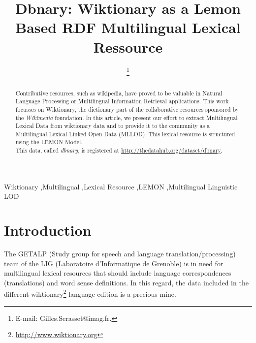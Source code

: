 \documentclass[sw]{iosart2c}
\begin{document}
\begin{frontmatter}

\title{Dbnary: Wiktionary as a Lemon Based RDF Multilingual Lexical Ressource}



\author{ \thanks{E-mail: Gilles.Serasset@imag.fr.}}
\address{GETALP-LIG, UJF-Grenoble 1 \\BP 53, 38051 Grenoble cedex 9, France\\ \texttt{gilles.serasset@imag.fr}}


\begin{abstract}
Contributive resources, such as wikipedia, have proved to be valuable in Natural Language Processing or Multilingual Information Retrieval applications. This work focusses on Wiktionary, the dictionary part of the collaborative resources sponsored by the \emph{Wikimedia} foundation. In this article, we present our effort to extract Multilingual Lexical Data from wiktionary data and to provide it to the community as a Multilingual Lexical Linked Open Data (MLLOD). This lexical resource is structured using the LEMON Model.\\
This data, called \textit{dbnary}, is registered at \url{http://thedatahub.org/dataset/dbnary}.
\end{abstract}

\begin{keyword}
Wiktionary \sep Multilingual \sep Lexical Resource \sep LEMON \sep Multilingual Linguistic LOD
\end{keyword}

\end{frontmatter}

\section{Introduction}

The GETALP (Study group for speech and language translation/processing) team of the LIG (Laboratoire d'Informatique de Grenoble) is in need for multilingual lexical resources that should include language correspondences (translations) and word sense definitions. In this regard, the data included in the different wiktionary\footnote{\url{http://www.wiktionary.org}} language edition is a precious mine.
\end{document}

